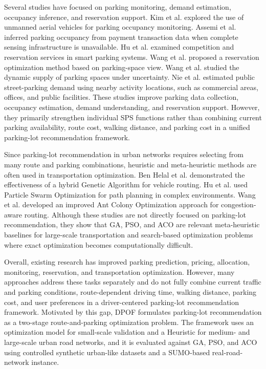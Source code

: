 Several studies have focused on parking monitoring, demand estimation, occupancy inference, and reservation support. Kim et al. \cite{ref12} explored the use of unmanned aerial vehicles for parking occupancy monitoring. Assemi et al. \cite{ref13} inferred parking occupancy from payment transaction data when complete sensing infrastructure is unavailable. Hu et al. \cite{ref14} examined competition and reservation services in smart parking systems. Wang et al. \cite{ref15} proposed a reservation optimization method based on parking-space view. Wang et al. \cite{ref16} studied the dynamic supply of parking spaces under uncertainty. Nie et al. \cite{ref17} estimated public street-parking demand using nearby activity locations, such as commercial areas, offices, and public facilities. These studies improve parking data collection, occupancy estimation, demand understanding, and reservation support. However, they primarily strengthen individual SPS functions rather than combining current parking availability, route cost, walking distance, and parking cost in a unified parking-lot recommendation framework.

Since parking-lot recommendation in urban networks requires selecting from many route and parking combinations, heuristic and meta-heuristic methods are often used in transportation optimization. Ben Helal et al. \cite{ref18} demonstrated the effectiveness of a hybrid Genetic Algorithm for vehicle routing. Hu et al. \cite{ref19} used Particle Swarm Optimization for path planning in complex environments. Wang et al. \cite{ref20} developed an improved Ant Colony Optimization approach for congestion-aware routing. Although these studies are not directly focused on parking-lot recommendation, they show that GA, PSO, and ACO are relevant meta-heuristic baselines for large-scale transportation and search-based optimization problems where exact optimization becomes computationally difficult.

Overall, existing research has improved parking prediction, pricing, allocation, monitoring, reservation, and transportation optimization. However, many approaches address these tasks separately and do not fully combine current traffic and parking conditions, route-dependent driving time, walking distance, parking cost, and user preferences in a driver-centered parking-lot recommendation framework. Motivated by this gap, DPOF formulates parking-lot recommendation as a two-stage route-and-parking optimization problem. The framework uses an optimization model for small-scale validation and a Heuristic for medium- and large-scale urban road networks, and it is evaluated against GA, PSO, and ACO using controlled synthetic urban-like datasets and a SUMO-based real-road-network instance.

